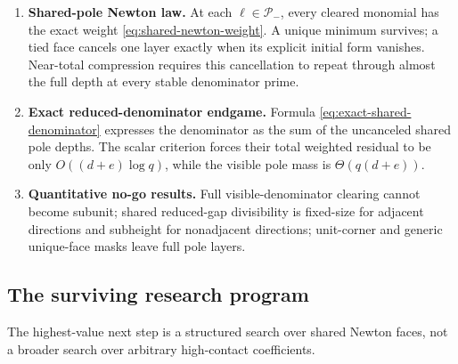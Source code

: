\documentclass[11pt,oneside]{article}
\theoremstyle{definition}
\theoremstyle{remark}
\begin{document}
\begin{enumerate}
\item \textbf{Shared-pole Newton law.}
  At each $\ell\in\mathcal P_-$, every cleared monomial has the exact weight
  \eqref{eq:shared-newton-weight}.  A unique minimum survives; a tied face cancels one layer
  exactly when its explicit initial form vanishes.  Near-total compression requires this
  cancellation to repeat through almost the full depth at every stable denominator prime.

\item \textbf{Exact reduced-denominator endgame.}
  Formula \eqref{eq:exact-shared-denominator} expresses the denominator as the sum of the
  uncanceled shared pole depths.  The scalar criterion forces their total weighted residual to
  be only $O((d+e)\log q)$, while the visible pole mass is $\Theta(q(d+e))$.

\item \textbf{Quantitative no-go results.}
  Full visible-denominator clearing cannot become subunit; shared reduced-gap divisibility is
  fixed-size for adjacent directions and subheight for nonadjacent directions; unit-corner and
  generic unique-face masks leave full pole layers.
\end{enumerate}

\subsection{The surviving research program}

The highest-value next step is a structured search over shared Newton faces, not a broader
search over arbitrary high-contact coefficients.
\end{document}
